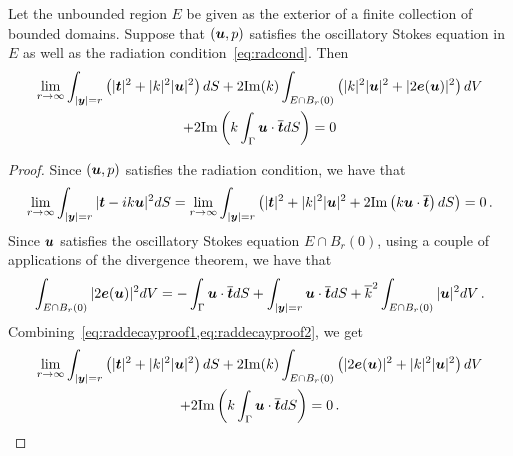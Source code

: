\begin{lem}
  \label{lem:rep}
  Let the unbounded region $E$ be given as the exterior
  of a finite collection of bounded domains.
  Suppose that $({\boldsymbol u},p)$ satisfies the oscillatory Stokes equation in 
  $E$ as well as the radiation condition~\cref{eq:radcond}. 
  Then 
  \begin{multline}
    \label{eq:repinfest}  
    \lim_{r\to\infty}
    \int_{|{\boldsymbol y}|=r} \left( |{\boldsymbol t}|^2 + |k|^2 |{\boldsymbol u}|^2 \right) dS +
    2 {\textrm{\textup{Im}}}(k) \int_{E \cap B_{r}(0)} \left(|k|^2 |{\boldsymbol u}|^2 + |2{\boldsymbol e}({\boldsymbol u})|^2 \right)
    dV \\
    + 2 {\textrm{\textup{Im}}} \left( k \int_{\Gamma} {\boldsymbol u} \cdot 
\overline{{\boldsymbol t}} dS  \right) = 0
  \end{multline}
  
\end{lem}

\begin{proof}
Since $({\boldsymbol u},p)$ satisfies the radiation condition, we have that
\begin{equation}
\lim_{r\to\infty} \int_{|{\boldsymbol y}|=r} | {\boldsymbol t} - i k {\boldsymbol u}|^2 dS = 
\lim_{r\to\infty} \int_{|{\boldsymbol y}| =r} \left( |{\boldsymbol t}|^2 + |k|^2|{\boldsymbol u}|^2 + 2 {\textrm{\textup{Im}}} 
\left( k {\boldsymbol u}\cdot \overline{{\boldsymbol t}} \right) dS \label{eq:raddecayproof1}
\right) = 0 \, . 
\end{equation}
Since ${\boldsymbol u}$ satisfies the oscillatory Stokes equation $E \cap B_{r}(0)$,
using a couple of applications of the divergence theorem, we have that
\begin{equation}
\int_{E\cap B_{r}(0)} |2 {\boldsymbol e}({\boldsymbol u})|^2 dV =
-\int_{\Gamma} {\boldsymbol u} \cdot \overline{{\boldsymbol t}} dS
+ \int_{|{\boldsymbol y}|=r} {\boldsymbol u} \cdot \overline{{\boldsymbol t}} dS + \overline{k}^2 
\int_{E \cap B_{r}(0)} |{\boldsymbol u}|^2 dV \,. \label{eq:raddecayproof2}
\end{equation}
Combining~\cref{eq:raddecayproof1,eq:raddecayproof2}, we get
\begin{multline*}
\lim_{r\to\infty} \int_{|{\boldsymbol y}|=r}\left(|{\boldsymbol t}|^2 + |k|^2 |{\boldsymbol u}|^2 \right) dS 
+ 2 {\textrm{\textup{Im}}}(k)\int_{E \cap B_{r}(0)} \left(|2{\boldsymbol e}({\boldsymbol u})|^2 + |k|^2 |{\boldsymbol u}|^2 
\right) dV \\
+ 2{\textrm{\textup{Im}}} \left ( k \int_{\Gamma} {\boldsymbol u} \cdot \overline{{\boldsymbol t}} dS \right) = 0 \, .
\end{multline*}
\end{proof}

